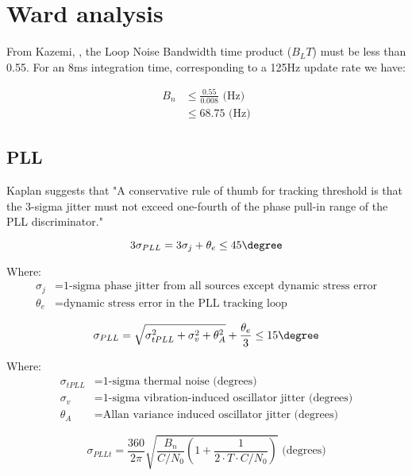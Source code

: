 \clearpage

\section{Ward analysis}

From Kazemi, \cite{Kazemi2008}, the Loop Noise Bandwidth time product ($B_L T$) must be less than 0.55. 
For an 8ms integration time, corresponding to a 125Hz update rate we have:

\begin{align*}
B_n &\leq \frac{0.55}{0.008} \text{ (Hz)}\\
    &\leq 68.75 \text{ (Hz)}
\end{align*}

\subsection{PLL}
Kaplan suggests that "A conservative rule of thumb for tracking threshold is that the 3-sigma jitter must not exceed one-fourth of the phase pull-in range of the PLL discriminator." %

\begin{equation}
3 \sigma_{PLL} = 3 \sigma_j +\theta_e \leq 45 \degree
\end{equation}

Where:
\begin{align*}
\sigma_j &= \text{1-sigma phase jitter from all sources except dynamic stress error} \\
\theta_e &= \text{dynamic stress error in the PLL tracking loop}
\end{align*}

\begin{equation}
\sigma_{PLL} = \sqrt{\sigma^2_{tPLL} + \sigma^2_v+ \theta^2_A} + \frac{\theta_e}{3} \leq 15 \degree 
\end{equation}

Where:
\begin{align*}
\sigma_{tPLL} &= \text{1-sigma thermal noise (degrees)}\\
\sigma_v &= \text{1-sigma vibration-induced oscillator jitter (degrees)}\\
\theta_A &= \text{Allan variance induced oscillator jitter (degrees)}
\end{align*}


\begin{equation}
\sigma_{PLLt} = \frac{360}{2 \pi} \sqrt{\frac{B_n}{C/N_0}(1+\frac{1}{2 \cdot T \cdot C/N_0})} \text{ (degrees)}
\end{equation}

